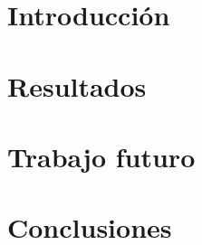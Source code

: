 
\section{Introducción}


\section{Resultados}


\section{Trabajo futuro}



\section{Conclusiones}
